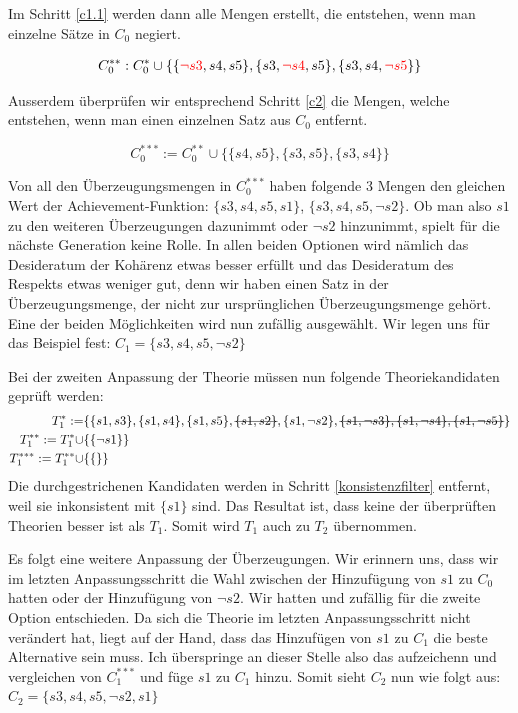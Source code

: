 \documentclass{article}
\newcommand{\stkout}[1]{\ifmmode\text{\sout{\ensuremath{#1}}}\else\sout{#1}\fi} %
\begin{document}
 Im Schritt \ref{c1.1} werden dann alle Mengen erstellt, die entstehen, wenn man einzelne Sätze in $C_0$ negiert.
 
 \begin{equation} \notag
 \begin{split}
 C_0^{**}: C_0^* \cup \{\{\textcolor{red}{\neg s3}, s4, s5\}, \{s3, \textcolor{red}{\neg s4}, s5\}, \{s3, s4, \textcolor{red}{\neg s5}\}\}
 \end{split}
 \end{equation}
 
 Ausserdem überprüfen wir entsprechend Schritt \ref{c2} die Mengen, welche entstehen, wenn man einen einzelnen Satz aus $C_0$ entfernt.
 
$$
    C_0^{***}:= C_0^{**} \cup \{ \{s4,s5\}, \{s3,s5\}, \{s3,s4\} \}
$$
 
 Von all den Überzeugungsmengen in $C_0^{***}$ haben folgende 3 Mengen den gleichen Wert der Achievement-Funktion: $\{s3,s4,s5,s1\}$, $\{s3,s4,s5,\neg s2\}$. Ob man also $s1$ zu den weiteren Überzeugungen dazunimmt oder $\neg s2$ hinzunimmt, spielt für die nächste Generation keine Rolle. In allen beiden Optionen wird nämlich das Desideratum der Kohärenz etwas besser erfüllt und das Desideratum des Respekts etwas weniger gut, denn wir haben einen Satz in der Überzeugungsmenge, der nicht zur ursprünglichen Überzeugungsmenge gehört. 
Eine der beiden Möglichkeiten wird nun zufällig ausgewählt. Wir legen uns für das Beispiel fest: $C_1 = \{s3, s4, s5, \neg s2\}$
 
 Bei der zweiten Anpassung der Theorie müssen nun folgende Theoriekandidaten geprüft werden:
\begin{align}
    T_1^{*}:= &\{\{s1, s3\}, \{s1, s4\}, \{s1, s5\},\stkout{\{s1, s2\}}, \{s1, \neg s2\}, \stkout{\{s1, \neg s3\}, \{s1, \neg s4\}, \{s1, \neg s5\}}\}\\
    T_1^{**}:= T_1^{*} \cup &\{\{\neg s1\}\}\\
    T_1^{***}:= T_1^{**} \cup &\{\{\}\}
\end{align}
Die durchgestrichenen Kandidaten werden in Schritt \ref{konsistenzfilter} entfernt, weil sie inkonsistent mit $\{s1\}$ sind.
 Das Resultat ist, dass keine der überprüften Theorien besser ist als $T_1$. Somit wird $T_1$ auch zu $T_2$ übernommen.
 
 Es folgt eine weitere Anpassung der Überzeugungen. Wir erinnern uns, dass wir im letzten Anpassungsschritt die Wahl zwischen der Hinzufügung von $s1$ zu $C_0$ hatten oder der Hinzufügung von $\neg s2$. Wir hatten und zufällig für die zweite Option entschieden. Da sich die Theorie im letzten Anpassungsschritt nicht verändert hat, liegt auf der Hand, dass das Hinzufügen von $s1$ zu $C_1$ die beste Alternative sein muss. Ich überspringe an dieser Stelle also das aufzeichenn und vergleichen von $C_1^{***}$ und füge $s1$ zu $C_1$ hinzu. Somit sieht $C_2$ nun wie folgt aus: $C_2 = \{s3, s4, s5, \neg s2, s1\}$
 
\end{document}
